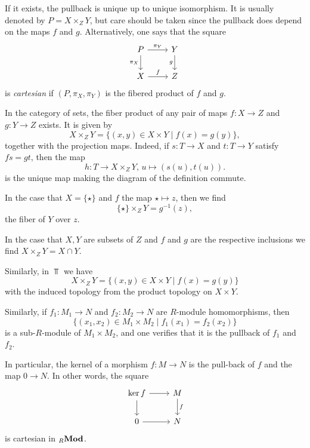  If it exists, the pullback is unique up to unique isomorphism. It is usually denoted by $P=X\times_Z Y$, but care should be taken since the pullback does depend on the maps $f$ and $g$. Alternatively, one  says that the square
 \[
 \begin{tikzcd}
 	P \arrow{r}{\pi_Y} \arrow[swap]{d}{\pi_X} & Y \arrow[swap]{d}{g} \\
	X \arrow{r}{f} & Z
\end{tikzcd}
\]
is \emph{cartesian} if $(P,\pi_X,\pi_Y)$ is the fibered product of $f$ and $g$.
 
\begin{example}
In the category of sets, the fiber product of any pair of maps $f\colon X\to Z$ and $g\colon Y\to Z$ exists. It is given by
\[
	X\times_Z Y = \{ (x,y) \in X\times Y \mid f(x) = g(y) \},
\]
together with the projection maps. Indeed, if $s\colon T\to X$ and $t\colon T\to Y$ satisfy $fs=gt$, then the  map
\[
	h\colon T \to X\times_Z Y,\, u \mapsto (s(u),t(u)).
\]
is the unique map making the diagram of the definition commute. 

In the  case that $X=\{\star\}$ and $f$ the map $\star \mapsto z$, then we find
\[
	\{\star\} \times_Z Y = g^{-1}(z),
\]
the fiber of $Y$ over $z$.

In the case that $X, Y$ are subsets of  $Z$ and $f$ and $g$ are the respective inclusions we find
$X\times_Z Y = X \cap Y$.
\end{example}

\begin{example}
Similarly, in $\Top$ we have
\[
	X\times_Z Y = \{ (x,y) \in X\times Y \mid f(x) = g(y) \}
\]
with the induced topology from the product topology on $X\times Y$.
\end{example}

\begin{example}
Similarly, if $f_1\colon M_1 \to N$ and $f_2\colon M_2 \to N$ are $R$-module homomorphisms, then
\[
	\{ (x_1,x_2) \in M_1\times M_2 \mid f_1(x_1)=f_2(x_2) \}
\]
is a sub-$R$-module of $M_1\times M_2$, and one verifies that it is the pullback of $f_1$ and $f_2$.
\end{example}

\begin{example}In particular, the kernel of a morphism $f\colon M\to N$ is the pull-back of $f$ and the map $0\to N$. In other words, the square
\[
	\begin{tikzcd}
		\ker f \arrow{r} \arrow{d} & M \arrow{d}{f} \\
		0 \arrow{r} & N
	\end{tikzcd}
\]
is cartesian in ${}_R\mathbf{Mod}$.
\end{example}


